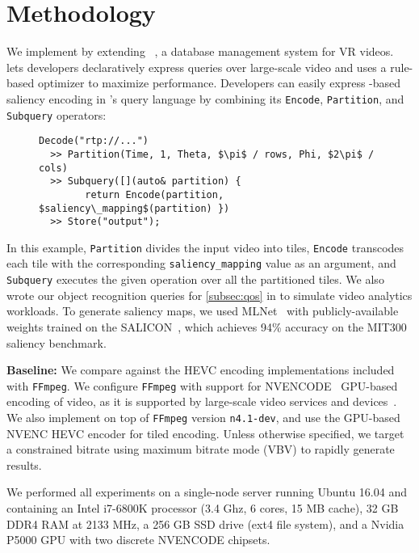 
\section{Methodology}
\label{sec:vignette-methodology}

We implement \name by extending \lightdb~\cite{lightdb}, a database management system for VR videos.
\lightdb{} lets developers declaratively express queries over large-scale video and uses a rule-based optimizer to maximize performance.
Developers can easily express \hevc-based saliency encoding in \lightdb's query language by combining its \texttt{Encode}, \texttt{Partition}, and \texttt{Subquery} operators:
\begin{figure}
\begin{lstlisting}[style=VRQL]
Decode("rtp://...")
  >> Partition(Time, 1, Theta, $\pi$ / rows, Phi, $2\pi$ / cols)
  >> Subquery([](auto& partition) {
        return Encode(partition, $saliency\_mapping$(partition) })
  >> Store("output");
\end{lstlisting}
\end{figure}

\noindent In this example, \texttt{Partition} divides the input video into tiles, \texttt{Encode} transcodes each tile with the corresponding \texttt{saliency\_mapping} value as an argument, and  \texttt{Subquery} executes the given operation over all the partitioned tiles.
We also wrote our object recognition queries for \ref{subsec:qos} in \lightdb to simulate video analytics workloads.
To generate saliency maps, we used MLNet~\cite{mlnet2016} with publicly-available weights trained on the SALICON~\cite{huang2015salicon}, which achieves 94\% accuracy on the MIT300 saliency benchmark.

\noindent\textbf{Baseline: } We compare \name against the HEVC encoding implementations included with \texttt{FFmpeg}.
We configure \texttt{FFmpeg} with support for NVENCODE~\cite{nvenc} GPU-based encoding of \hevc video, as it is supported by large-scale video services and devices~\cite{de2016large}.
We also implement \nameCompress on top of \texttt{FFmpeg} version \texttt{n4.1-dev}, and use the GPU-based NVENC HEVC encoder for tiled encoding.
Unless otherwise specified, we target a constrained bitrate using maximum bitrate mode (VBV) to rapidly generate results.

We performed all experiments on a single-node server running Ubuntu 16.04 and containing an Intel i7-6800K processor (3.4 Ghz, 6 cores, 15 MB cache), 32 GB DDR4 RAM at 2133 MHz, a 256 GB SSD drive (ext4 file system), and a Nvidia P5000 GPU with two discrete NVENCODE chipsets.

